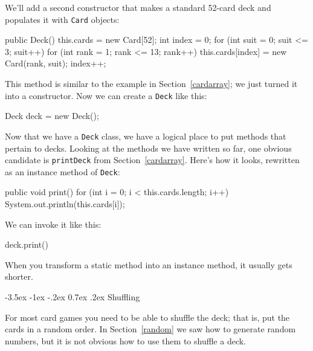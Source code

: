 \documentclass[12pt]{book}
\makeatletter
\theoremstyle{exercise}
\newcommand{\java}[1]{\verb"#1"}
\renewcommand{\section}{\@startsection{section}{1}{\z@}%
    {-3.5ex \@plus -1ex \@minus -.2ex}%
    {0.7ex \@plus.2ex}%
    {\normalfont\Large\bfseries}}
\newcommand{\java}[1]{\lstinline{#1}} %
\makeatother
\begin{document}
We'll add a second constructor that makes a standard 52-card deck and populates it with \java{Card} objects:

\begin{code}
    public Deck() {
        this.cards = new Card[52];
        int index = 0;
        for (int suit = 0; suit <= 3; suit++) {
            for (int rank = 1; rank <= 13; rank++) {
                this.cards[index] = new Card(rank, suit);
                index++;
            }
        }
    }
\end{code}


This method is similar to the example in Section~\ref{cardarray}; we just turned it into a constructor.
Now we can create a \java{Deck} like this:

\begin{code}
    Deck deck = new Deck();
\end{code}


Now that we have a \java{Deck} class, we have a logical place to put methods that pertain to decks.
Looking at the methods we have written so far, one obvious candidate is \java{printDeck} from Section~\ref{cardarray}.
Here's how it looks, rewritten as an instance method of \java{Deck}:

\begin{code}
    public void print() {
        for (int i = 0; i < this.cards.length; i++) {
            System.out.println(this.cards[i]);
        }
    }
\end{code}

We can invoke it like this:

\begin{code}
    deck.print()
\end{code}

When you transform a static method into an instance method, it usually gets shorter.


\section{Shuffling}
\label{shuffle}


For most card games you need to be able to shuffle the deck; that is, put the cards in a random order.
In Section~\ref{random} we saw how to generate random numbers, but it is not obvious how to use them to shuffle a deck.
\end{document}
